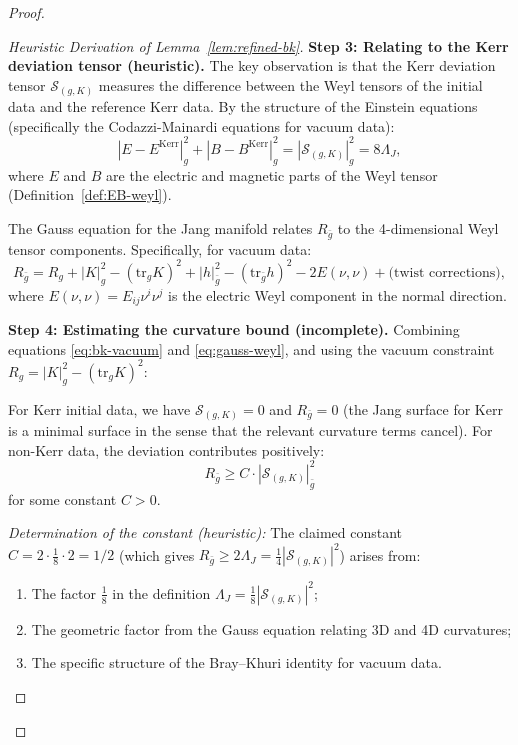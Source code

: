 \documentclass[12pt]{article}
\theoremstyle{plain}
\theoremstyle{definition}
\theoremstyle{remark}
\newcommand{\tr}{\mathrm{tr}}
\newcommand{\bg}{\bar{g}}
\begin{document}
\begin{proof}
\begin{proof}[Heuristic Derivation of Lemma~\ref{lem:refined-bk}]
\textbf{Step 3: Relating to the Kerr deviation tensor (heuristic).}
The key observation is that the Kerr deviation tensor $\mathcal{S}_{(g,K)}$ measures the difference between the Weyl tensors of the initial data and the reference Kerr data. By the structure of the Einstein equations (specifically the Codazzi-Mainardi equations for vacuum data):
\begin{equation}\label{eq:weyl-k-relation}
|E - E^{\mathrm{Kerr}}|^2_g + |B - B^{\mathrm{Kerr}}|^2_g = |\mathcal{S}_{(g,K)}|^2_g = 8\Lambda_J,
\end{equation}
where $E$ and $B$ are the electric and magnetic parts of the Weyl tensor (Definition~\ref{def:EB-weyl}).

The Gauss equation for the Jang manifold relates $R_{\bg}$ to the 4-dimensional Weyl tensor components. Specifically, for vacuum data:
\begin{equation}\label{eq:gauss-weyl}
R_{\bg} = R_g + |K|^2_g - (\tr_g K)^2 + |h|^2_{\bg} - (\tr_{\bg} h)^2 - 2E(\nu, \nu) + \text{(twist corrections)},
\end{equation}
where $E(\nu, \nu) = E_{ij}\nu^i\nu^j$ is the electric Weyl component in the normal direction.

\textbf{Step 4: Estimating the curvature bound (incomplete).}
Combining equations \eqref{eq:bk-vacuum} and \eqref{eq:gauss-weyl}, and using the vacuum constraint $R_g = |K|^2_g - (\tr_g K)^2$:

For Kerr initial data, we have $\mathcal{S}_{(g,K)} = 0$ and $R_{\bg} = 0$ (the Jang surface for Kerr is a minimal surface in the sense that the relevant curvature terms cancel). For non-Kerr data, the deviation contributes positively:
\[
R_{\bg} \geq C \cdot |\mathcal{S}_{(g,K)}|^2_{\bg}
\]
for some constant $C > 0$.

\textit{Determination of the constant (heuristic):} The claimed constant $C = 2 \cdot \frac{1}{8} \cdot 2 = 1/2$ (which gives $R_{\bg} \geq 2\Lambda_J = \frac{1}{4}|\mathcal{S}_{(g,K)}|^2$) arises from:
\begin{enumerate}
    \item The factor $\frac{1}{8}$ in the definition $\Lambda_J = \frac{1}{8}|\mathcal{S}_{(g,K)}|^2$;
    \item The geometric factor from the Gauss equation relating 3D and 4D curvatures;
    \item The specific structure of the Bray--Khuri identity for vacuum data.
\end{enumerate}


\end{proof}
\end{proof}
\end{document}
